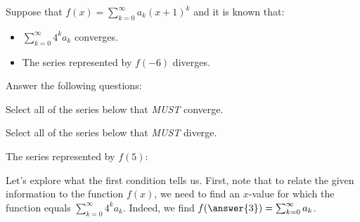 \documentclass{ximera}
\author{Jim Talamo}
\begin{document}
\begin{exercise}
  Suppose that $f(x) = \sum_{k=0}^{\infty} a_k (x+1)^k$ and it is
  known that:
  \begin{itemize}
  \item $\sum_{k=0}^{\infty} 4^k a_k$ converges.
  \item The series represented by $f(-6)$ diverges.
  \end{itemize}
  


Answer the following questions:

\begin{exercise}
Select all of the series below that \emph{MUST} converge.
\begin{selectAll}
\end{selectAll}
\end{exercise}

\begin{exercise}
Select all of the series below that \emph{MUST} diverge.
\begin{selectAll}
\end{selectAll}
\end{exercise}

\begin{exercise}
The series represented by $f(5)$:

\begin{multipleChoice}
\end{multipleChoice}
\end{exercise}


\begin{hint}

\begin{question}
Let's explore what the first condition tells us.  First, note that to relate the given information to the function $f(x)$, we need to find an $x$-value for which the function equals $\sum_{k=0}^{\infty} 4^k a_k$.  Indeed, we find $f(\answer{3}) = \sum_{k=0}^{\infty} a_k$.  


\end{question}
\end{hint}
\end{exercise}
\end{document}
